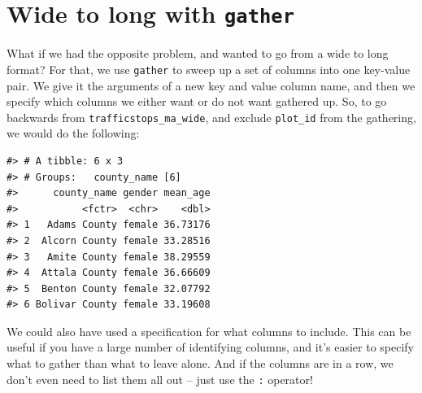 \documentclass[]{book}
\newenvironment{Shaded}{\begin{snugshade}}{\end{snugshade}}
\newcommand{\KeywordTok}[1]{\textcolor[rgb]{0.13,0.29,0.53}{\textbf{#1}}}
\newcommand{\StringTok}[1]{\textcolor[rgb]{0.31,0.60,0.02}{#1}}
\newcommand{\OperatorTok}[1]{\textcolor[rgb]{0.81,0.36,0.00}{\textbf{#1}}}
\newcommand{\NormalTok}[1]{#1}
\theoremstyle{definition}
\theoremstyle{definition}
\theoremstyle{definition}
\theoremstyle{remark}
\begin{document}
\section{\texorpdfstring{Wide to long with
\texttt{gather}}{Wide to long with gather}}\label{wide-to-long-with-gather}

What if we had the opposite problem, and wanted to go from a wide to
long format? For that, we use \texttt{gather} to sweep up a set of
columns into one key-value pair. We give it the arguments of a new key
and value column name, and then we specify which columns we either want
or do not want gathered up. So, to go backwards from
\texttt{trafficstops\_ma\_wide}, and exclude \texttt{plot\_id} from the
gathering, we would do the following:

\begin{Shaded}
\end{Shaded}

\begin{verbatim}
#> # A tibble: 6 x 3
#> # Groups:   county_name [6]
#>      county_name gender mean_age
#>           <fctr>  <chr>    <dbl>
#> 1   Adams County female 36.73176
#> 2  Alcorn County female 33.28516
#> 3   Amite County female 38.29559
#> 4  Attala County female 36.66609
#> 5  Benton County female 32.07792
#> 6 Bolivar County female 33.19608
\end{verbatim}

We could also have used a specification for what columns to include.
This can be useful if you have a large number of identifying columns,
and it's easier to specify what to gather than what to leave alone. And
if the columns are in a row, we don't even need to list them all out --
just use the \texttt{:} operator!

\begin{Shaded}
\end{Shaded}
\end{document}
